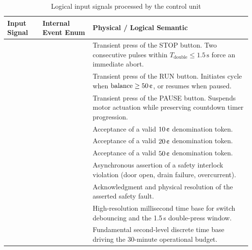 \begin{table}[H]
  \centering
  \caption{Logical input signals processed by the control unit}
  \label{tab:inputs}
  \small
  \renewcommand{\arraystretch}{1.18}
  \begin{tabularx}{\linewidth}{L{2.5cm}L{4.6cm}Y}
    \toprule
    \textbf{Input Signal} & \textbf{Internal Event Enum} & \textbf{Physical / Logical Semantic} \\
    \midrule
              &        & Transient press of the STOP button. Two consecutive pulses within $T_{\text{double}} \le 1.5\,\text{s}$ force an immediate abort. \\
               &         & Transient press of the RUN button. Initiates cycle when $\text{balance} \ge 50\,\text{\textcent}$, or resumes when paused. \\
             &       & Transient press of the PAUSE button. Suspends motor actuation while preserving countdown timer progression. \\
      &        & Acceptance of a valid $10\,\text{\textcent}$ denomination token. \\
      &        & Acceptance of a valid $20\,\text{\textcent}$ denomination token. \\
      &        & Acceptance of a valid $50\,\text{\textcent}$ denomination token. \\
     &  & Asynchronous assertion of a safety interlock violation (door open, drain failure, overcurrent). \\
     &   & Acknowledgment and physical resolution of the asserted safety fault. \\
        &   & High-resolution millisecond time base for switch debouncing and the 1.5\,s double-press window. \\
         &   & Fundamental second-level discrete time base driving the 30-minute operational budget. \\
    \bottomrule
  \end{tabularx}
\end{table}


